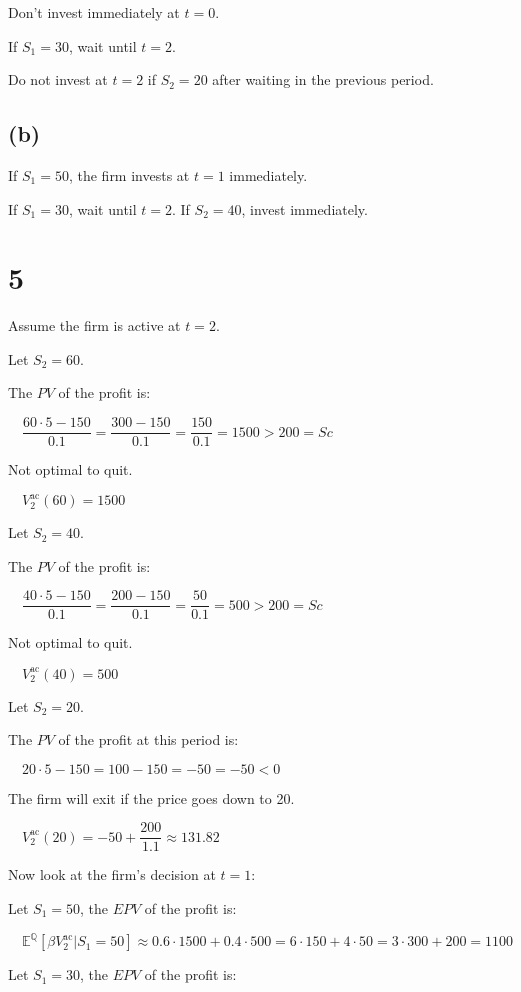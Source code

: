 \documentclass{article}
\begin{document}
Don't invest immediately at $t=0$.

If $S_{1}=30$, wait until $t=2$. 

Do not invest at $t=2$ if $S_{2}=20$ after waiting in the previous period.

\subsection*{(b)}

If $S_{1}=50$, the firm invests at $t=1$ immediately.

If $S_{1}=30$, wait until $t=2$. If $S_{2}=40$, invest immediately. 

\section*{5}

Assume the firm is active at $t=2$.

Let $S_{2}=60$.

The $PV$ of the profit is: 

$\quad \dfrac{60\cdot5-150}{0.1}=\dfrac{300-150}{0.1}=\dfrac{150}{0.1}=1500>200=Sc$

Not optimal to quit.

$\quad V^{\text{ac}}_{2}\left(60\right)=1500$

Let $S_{2}=40$.

The $PV$ of the profit is: 

$\quad \dfrac{40\cdot5-150}{0.1}=\dfrac{200-150}{0.1}=\dfrac{50}{0.1}=500>200=Sc$

Not optimal to quit.

$\quad V^{\text{ac}}_{2}\left(40\right)=500$

Let $S_{2}=20$.

The $PV$ of the profit at this period is: 

$\quad 20\cdot5-150=100-150=-50=-50<0$

The firm will exit if the price goes down to 20. 

$\quad V^{\text{ac}}_{2}\left(20\right)=-50+\dfrac{200}{1.1}\approx131.82$

Now look at the firm's decision at $t=1$:

Let $S_{1}=50$, the $EPV$ of the profit is:

$\quad \mathbb{E} ^{\mathbb{Q} }\left[\beta V^{\text{ac}}_{2}|S_{1}=50\right]\approx0.6\cdot1500+0.4\cdot500=6\cdot150+4\cdot50=3\cdot300+200=1100$

Let $S_{1}=30$, the $EPV$ of the profit is:
\end{document}
